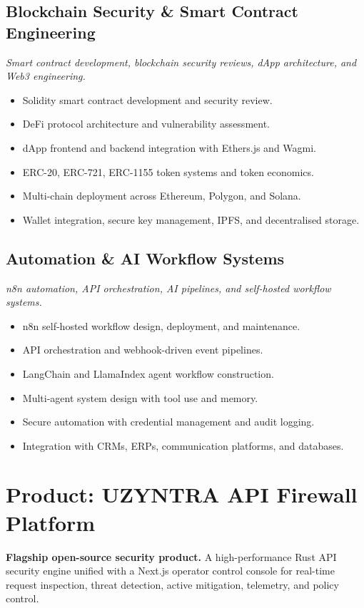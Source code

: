 \documentclass[11pt,a4paper]{article}
\begin{document}
\subsection{Blockchain Security \& Smart Contract Engineering}
\begin{redbar}\textit{Smart contract development, blockchain security reviews, dApp architecture, and Web3 engineering.}\end{redbar}
\begin{itemize}
  \item Solidity smart contract development and security review.
  \item DeFi protocol architecture and vulnerability assessment.
  \item dApp frontend and backend integration with Ethers.js and Wagmi.
  \item ERC-20, ERC-721, ERC-1155 token systems and token economics.
  \item Multi-chain deployment across Ethereum, Polygon, and Solana.
  \item Wallet integration, secure key management, IPFS, and decentralised storage.
\end{itemize}

\subsection{Automation \& AI Workflow Systems}
\begin{redbar}\textit{n8n automation, API orchestration, AI pipelines, and self-hosted workflow systems.}\end{redbar}
\begin{itemize}
  \item n8n self-hosted workflow design, deployment, and maintenance.
  \item API orchestration and webhook-driven event pipelines.
  \item LangChain and LlamaIndex agent workflow construction.
  \item Multi-agent system design with tool use and memory.
  \item Secure automation with credential management and audit logging.
  \item Integration with CRMs, ERPs, communication platforms, and databases.
\end{itemize}

\section{Product: UZYNTRA API Firewall Platform}
\begin{redbar}
\textbf{Flagship open-source security product.} A high-performance Rust API security engine unified with a Next.js operator control console for real-time request inspection, threat detection, active mitigation, telemetry, and policy control.
\end{redbar}
\end{document}
